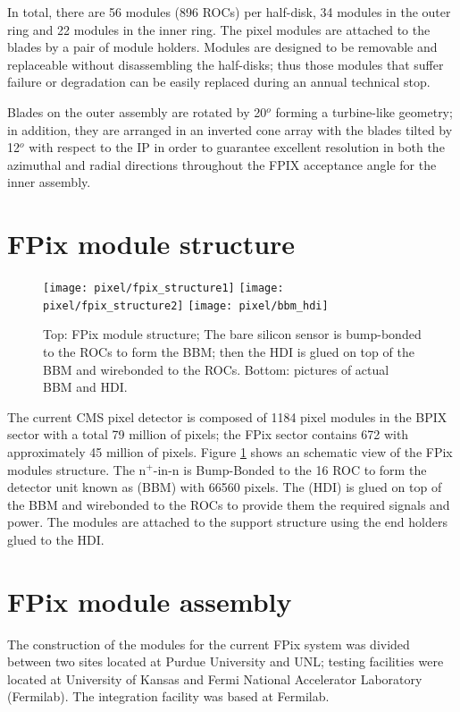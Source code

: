 In total, there are 56 modules (896 ROCs) per half-disk, 34 modules in the outer ring and 22 modules in the inner ring. The pixel modules are attached to the blades by a pair of module holders. Modules are designed to be removable and replaceable without disassembling the half-disks; thus those modules that suffer failure or degradation can be easily replaced during an annual technical stop.

Blades on the outer assembly are rotated by 20$^o$ forming a turbine-like geometry; in addition, they are arranged in an inverted cone array with the blades tilted by 12$^o$ with respect to the IP in order to guarantee excellent resolution in both the azimuthal and radial directions throughout the FPIX acceptance angle for the inner assembly.

\section{FPix module structure}

\begin{figure}[!h]
  \centering
  \texttt{[image: pixel/fpix\_structure1]}
  \texttt{[image: pixel/fpix\_structure2]}
  \texttt{[image: pixel/bbm\_hdi]}
  \caption[FPix module structure.]{Top: FPix module structure; The bare silicon sensor is bump-bonded to the ROCs to form the BBM; then the HDI is glued on top of the BBM and wirebonded to the ROCs. Bottom: pictures of actual BBM and HDI.}\label{fig:fpix_struc}
\end{figure}

The current CMS pixel detector is composed of 1184 pixel modules in the BPIX sector with a total 79 million of pixels; the FPix sector contains 672 with approximately 45 million of pixels. Figure \ref{fig:fpix_struc} shows an schematic view of the FPix modules structure. The n$^{+}$-in-n  is Bump-Bonded to the 16 ROC to form the detector unit known as  (BBM) with 66560 pixels. The  (HDI) is glued on top of the BBM and wirebonded to the ROCs to provide them the required signals and power. The modules are attached to the support structure using the end holders glued to the HDI.

\section{FPix module assembly}

The construction of the modules for the current FPix system was divided between two sites located at Purdue University and UNL; testing facilities were located at University of Kansas and Fermi National Accelerator Laboratory (Fermilab). The integration facility was based at Fermilab. 

